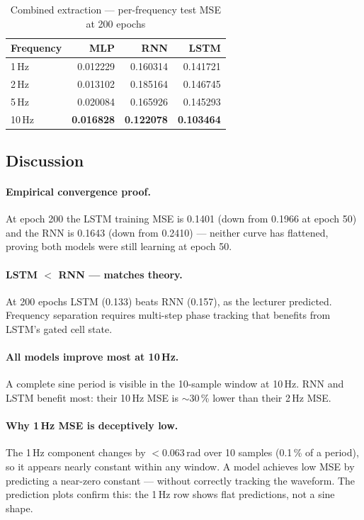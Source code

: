 \documentclass[12pt, a4paper]{article}
\begin{document}
\begin{table}[H]
\centering
\caption{Combined extraction — per-frequency test MSE at 200 epochs}
\label{tab:combined_perfreq}
\begin{tabular}{lrrr}
\toprule
\textbf{Frequency} & \textbf{MLP} & \textbf{RNN} & \textbf{LSTM} \\
\midrule
1\,Hz  & 0.012229 & 0.160314 & 0.141721 \\
2\,Hz  & 0.013102 & 0.185164 & 0.146745 \\
5\,Hz  & 0.020084 & 0.165926 & 0.145293 \\
10\,Hz & \textbf{0.016828} & \textbf{0.122078} & \textbf{0.103464} \\
\bottomrule
\end{tabular}
\end{table}

\subsection{Discussion}

\paragraph{Empirical convergence proof.}
At epoch 200 the LSTM training MSE is 0.1401 (down from 0.1966 at epoch 50)
and the RNN is 0.1643 (down from 0.2410) — neither curve has flattened,
proving both models were still learning at epoch 50.

\paragraph{LSTM $<$ RNN — matches theory.}
At 200 epochs LSTM (0.133) beats RNN (0.157), as the lecturer predicted.
Frequency separation requires multi-step phase tracking that benefits
from LSTM's gated cell state.

\paragraph{All models improve most at 10\,Hz.}
A complete sine period is visible in the 10-sample window at 10\,Hz.
RNN and LSTM benefit most: their 10\,Hz MSE is $\sim$30\,\% lower than
their 2\,Hz MSE.

\paragraph{Why 1\,Hz MSE is deceptively low.}
The 1\,Hz component changes by $<$0.063\,rad over 10 samples (0.1\,\% of
a period), so it appears nearly constant within any window.
A model achieves low MSE by predicting a near-zero constant — without
correctly tracking the waveform. The prediction plots confirm this:
the 1\,Hz row shows flat predictions, not a sine shape.
\end{document}
